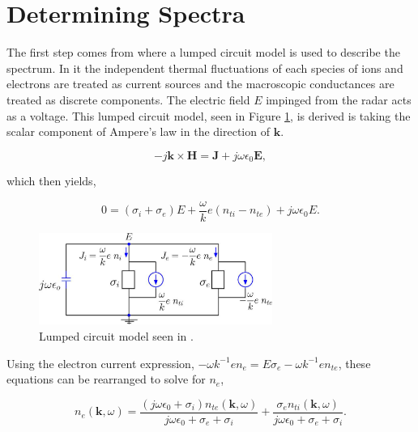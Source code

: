\documentclass[10pt]{report}
\begin{document}
\section*{Determining Spectra}
The first step comes from \cite{kudeki:milla:1} where a lumped circuit model is used to describe the spectrum. In it the independent thermal fluctuations of each species of ions and electrons are treated as current sources and the macroscopic conductances are treated as discrete components. The electric field $E$ impinged from the radar acts as a voltage. This lumped circuit model, seen in Figure \ref{fig:circuit}, is derived is taking the scalar component of Ampere's law in the direction of $\mathbf{k}$.  

\begin{equation}
\label{eq:ampere}
-j\mathbf{k} \times \mathbf{H} = \mathbf{J} +j\omega \epsilon_0 \mathbf{E},
\end{equation}

\noindent which then yields,

\begin{equation} 
\label{eq:ampscaler}
0=(\sigma_i +\sigma_e)E +\frac{\omega}{k}e(n_{ti}-n_{te}) +j\omega \epsilon_0 E.
\end{equation}

\begin{figure}[!h]
\centering
\includegraphics[width=3.0in]{circuit}
\caption{Lumped circuit model seen in  \cite{kudeki:milla:1}.}
\label{fig:circuit}
\end{figure}

\noindent Using the electron current expression, $-\omega k^{-1}en_e = E\sigma_e -\omega k^{-1}en_{te}$, these equations can be rearranged to solve for $n_e$, 

\begin{equation}
\label{eq:neeq}
n_e(\mathbf{k},\omega) =  \frac{(j\omega\epsilon_0 + \sigma_i) n_{te}(\mathbf{k},\omega)}{j\omega\epsilon_0 +\sigma_e+\sigma_i} + \frac{\sigma_en_{ti}(\mathbf{k},\omega)}{j\omega\epsilon_0 +\sigma_e+\sigma_i}.
\end{equation}
\end{document}
